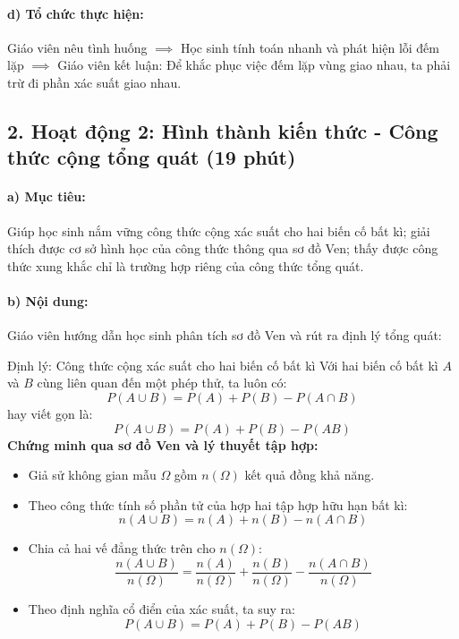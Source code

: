\documentclass[12pt, a4paper]{article}
\begin{document}
\paragraph{d) Tổ chức thực hiện:} Giáo viên nêu tình huống $\implies$ Học sinh tính toán nhanh và phát hiện lỗi đếm lặp $\implies$ Giáo viên kết luận: Để khắc phục việc đếm lặp vùng giao nhau, ta phải trừ đi phần xác suất giao nhau.

\subsection*{2. Hoạt động 2: Hình thành kiến thức - Công thức cộng tổng quát (19 phút)}

\paragraph{a) Mục tiêu:} Giúp học sinh nắm vững công thức cộng xác suất cho hai biến cố bất kì; giải thích được cơ sở hình học của công thức thông qua sơ đồ Ven; thấy được công thức xung khắc chỉ là trường hợp riêng của công thức tổng quát.

\paragraph{b) Nội dung:} Giáo viên hướng dẫn học sinh phân tích sơ đồ Ven và rút ra định lý tổng quát:

\begin{pedabox}{Định lý: Công thức cộng xác suất cho hai biến cố bất kì}
Với hai biến cố bất kì $A$ và $B$ cùng liên quan đến một phép thử, ta luôn có:
\begin{equation}
    P(A \cup B) = P(A) + P(B) - P(A \cap B)
\end{equation}
hay viết gọn là:
\begin{equation}
    P(A \cup B) = P(A) + P(B) - P(AB)
\end{equation}
\textbf{Chứng minh qua sơ đồ Ven và lý thuyết tập hợp:}
\begin{itemize}[leftmargin=0.5cm]
    \item Giả sử không gian mẫu $\Omega$ gồm $n(\Omega)$ kết quả đồng khả năng.
    \item Theo công thức tính số phần tử của hợp hai tập hợp hữu hạn bất kì:
    $$n(A \cup B) = n(A) + n(B) - n(A \cap B)$$
    \item Chia cả hai vế đẳng thức trên cho $n(\Omega)$:
    $$\dfrac{n(A \cup B)}{n(\Omega)} = \dfrac{n(A)}{n(\Omega)} + \dfrac{n(B)}{n(\Omega)} - \dfrac{n(A \cap B)}{n(\Omega)}$$
    \item Theo định nghĩa cổ điển của xác suất, ta suy ra:
    $$P(A \cup B) = P(A) + P(B) - P(AB)$$
\end{itemize}
\end{pedabox}
\end{document}
